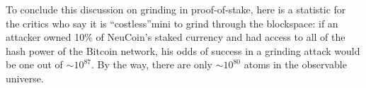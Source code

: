 \documentclass[a4paper,11pt]{article}
\begin{document}





To conclude this discussion on grinding in proof-of-stake, here is a statistic for the critics who say it is ``costless''mini to grind through the blockspace: if an attacker owned 10\% of NeuCoin's staked currency and had access to all of the hash power of the Bitcoin network, his odds of success in a grinding attack would be one out of $\sim10^{87}$. By the way, there are only $\sim10^{80}$ atoms in the observable universe.
\end{document}
